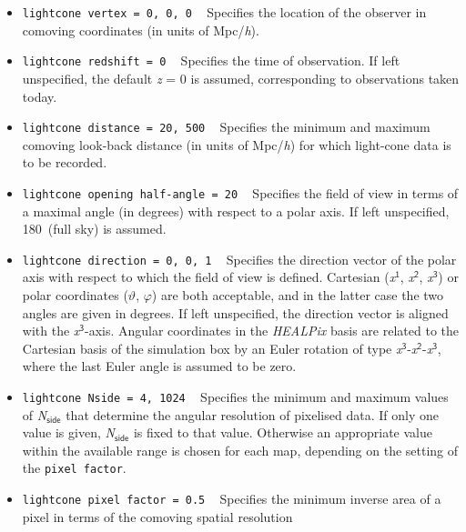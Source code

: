 \documentclass[a4paper,10pt]{article}
\begin{document}
\begin{itemize}
 \item[] \hspace{-25pt}\texttt{lightcone vertex = 0, 0, 0} ~ Specifies the location of the observer in comoving coordinates (in units of Mpc/\textit{h}).
 \item[] \hspace{-25pt}\texttt{lightcone redshift = 0} ~ Specifies the time of observation. If left unspecified, the default \textit{z} = 0 is assumed,
 corresponding to observations taken today.
 \item[] \hspace{-25pt}\texttt{lightcone distance = 20, 500} ~ Specifies the minimum and maximum comoving look-back distance (in units of Mpc/\textit{h})
 for which light-cone data is to be recorded.
 \item[] \hspace{-25pt}\texttt{lightcone opening half-angle = 20} ~ Specifies the field of view in terms of a maximal angle (in degrees) with respect to
 a polar axis. If left unspecified, 180\textdegree\, (full sky) is assumed.
 \item[] \hspace{-25pt}\texttt{lightcone direction = 0, 0, 1} ~ Specifies the direction vector of the polar axis with respect to which the field of view is
 defined. Cartesian (\textit{x}$^\mathsf{1}$, \textit{x}$^\mathsf{2}$, \textit{x}$^\mathsf{3}$) or polar coordinates ($\mathsf{\vartheta}$, $\mathsf{\varphi}$)
 are both acceptable, and in the latter case the two angles are given in degrees.  If left unspecified, the direction vector is aligned with the
 \textit{x}$^\mathsf{3}$-axis. Angular coordinates in the \textit{HEALPix} basis are related to the Cartesian basis of the simulation box by an Euler
 rotation of type \textit{x}$^\mathsf{3}$-\textit{x}$^\mathsf{2}$-\textit{x}$^\mathsf{3}$, where the last Euler angle is assumed to be zero.
 \item[] \hspace{-25pt}\texttt{lightcone Nside = 4, 1024} ~ Specifies the minimum and maximum values of \textit{N}$_\mathsf{side}$ that determine the
 angular resolution of pixelised data. If only one value is given, \textit{N}$_\mathsf{side}$ is fixed to that value. Otherwise an appropriate value
 within the available range is chosen for each map, depending on the setting of the \texttt{pixel factor}.
 \item[] \hspace{-25pt}\texttt{lightcone pixel factor = 0.5} ~ Specifies the minimum inverse area of a pixel in terms of the comoving spatial resolution

\end{itemize}
\end{document}
